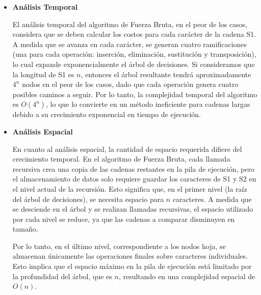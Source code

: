  \begin{itemize}
     \item \textbf{Análisis Temporal}
     
     El análisis temporal del algoritmo de Fuerza Bruta, en el peor de los casos, considera que se deben calcular los costos para cada carácter de la cadena S1. A medida que se avanza en cada carácter, se generan cuatro ramificaciones (una para cada operación: inserción, eliminación, sustitución y transposición), lo cual expande exponencialmente el árbol de decisiones. Si consideramos que la longitud de S1 es \( n \), entonces el árbol resultante tendrá aproximadamente \( 4^n \) nodos en el peor de los casos, dado que cada operación genera cuatro posibles caminos a seguir. Por lo tanto, la complejidad temporal del algoritmo es \( O(4^n) \), lo que lo convierte en un método ineficiente para cadenas largas debido a su crecimiento exponencial en tiempo de ejecución.

    \item \textbf{Análisis Espacial}

    En cuanto al análisis espacial, la cantidad de espacio requerida difiere del crecimiento temporal. En el algoritmo de Fuerza Bruta, cada llamada recursiva crea una copia de las cadenas restantes en la pila de ejecución, pero el almacenamiento de datos solo requiere guardar los caracteres de S1 y S2 en el nivel actual de la recursión. Esto significa que, en el primer nivel (la raíz del árbol de decisiones), se necesita espacio para \( n \) caracteres. A medida que se desciende en el árbol y se realizan llamadas recursivas, el espacio utilizado por cada nivel se reduce, ya que las cadenas a comparar disminuyen en tamaño. 

    Por lo tanto, en el último nivel, correspondiente a los nodos hoja, se almacenan únicamente las operaciones finales sobre caracteres individuales. Esto implica que el espacio máximo en la pila de ejecución está limitado por la profundidad del árbol, que es \( n \), resultando en una complejidad espacial de \( O(n) \).

 \end{itemize}

